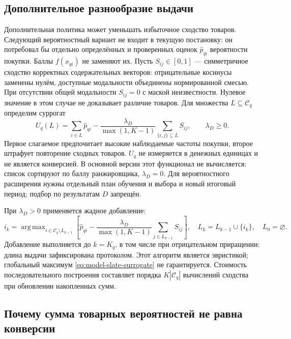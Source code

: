 \documentclass[12pt,a4paper]{article}
\DeclareMathOperator*{\argmax}{arg\,max}
\theoremstyle{plainru}
\begin{document}
\subsection{Дополнительное разнообразие выдачи}\label{sec:model-diversity-optional}

Дополнительная политика может уменьшать избыточное сходство товаров.
Следующий вероятностный вариант не входит в текущую постановку:
он потребовал бы отдельно определённых и проверенных оценок
$\widehat p_{qi}$ вероятности покупки. Баллы $f(x_{qi})$ не заменяют их.
Пусть $S_{ij}\in[0,1]$ --- симметричное сходство корректных
содержательных векторов: отрицательные косинусы заменены нулём,
доступные модальности объединены нормированной смесью.
При отсутствии общей модальности $S_{ij}=0$ с маской неизвестности.
Нулевое значение в этом случае не доказывает различие товаров.
Для множества $L\subseteq\mathcal C_q$ определим суррогат
\begin{equation}\label{eq:model-slate-surrogate}
U_q(L)=\sum_{i\in L}\widehat p_{qi}
-\frac{\lambda_D}{\max(1,K-1)}
\sum_{\{i,j\}\subseteq L}S_{ij},\qquad\lambda_D\ge0.
\end{equation}
Первое слагаемое предпочитает высокие наблюдаемые частоты покупки,
второе штрафует повторение сходных товаров.
$U_q$ не измеряется в денежных единицах и не является конверсией.
В основной версии этот функционал не вычисляется: список сортируют
по баллу ранжировщика, $\lambda_D=0$. Для вероятностного расширения
нужны отдельный план обучения и выбора и новый итоговый период;
подбор по результатам $D$ запрещён.

При $\lambda_D>0$ применяется жадное добавление:
\begin{equation}\label{eq:model-greedy-slate}
i_k=\argmax_{i\in\mathcal C_q\setminus L_{k-1}}
\left[\widehat p_{qi}-
\frac{\lambda_D}{\max(1,K-1)}\sum_{j\in L_{k-1}}S_{ij}\right],
\quad L_k=L_{k-1}\cup\{i_k\},\quad L_0=\varnothing.
\end{equation}
Добавление выполняется до $k=K_q$, в том числе при отрицательном
приращении: длина выдачи зафиксирована протоколом.
Этот алгоритм является эвристикой; глобальный максимум
\eqref{eq:model-slate-surrogate} не гарантируется.
Стоимость последовательного построения составляет порядка
$K|\mathcal C_q|$ вычислений сходства при обновлении накопленных сумм.

\subsection{Почему сумма товарных вероятностей не равна конверсии}
\end{document}
